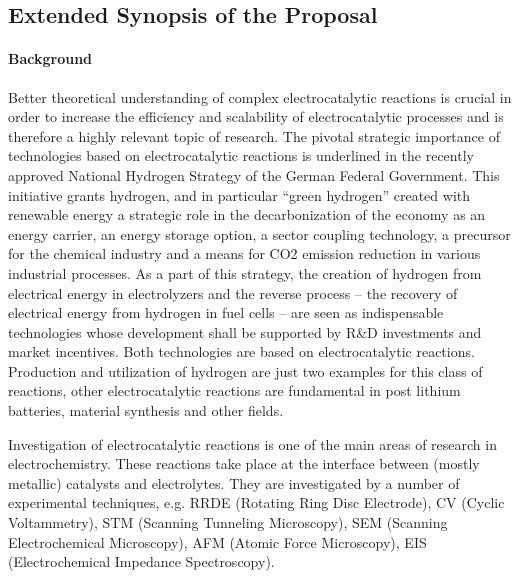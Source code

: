 \documentclass[a4paper,10pt]{article}
\begin{document}
\insertProjectHeader
{}


\subsection*{Extended Synopsis of the Proposal}

\paragraph{Background}

Better theoretical understanding of complex electrocatalytic reactions is
crucial in order to increase the efficiency  and scalability  of electrocatalytic processes
and is therefore a highly relevant topic of research.
The pivotal strategic importance of  technologies based on electrocatalytic reactions
is underlined in  the  recently  approved  National Hydrogen  Strategy of  the  German
Federal  Government. This initiative  grants  hydrogen,  and  in   particular  ``green
hydrogen''  created with  renewable  energy a  strategic  role in  the
decarbonization of the economy as an energy carrier, an energy storage
option, a  sector coupling  technology, a  precursor for  the chemical
industry  and a  means  for  CO2  emission reduction  in  various
industrial  processes. 
As  a part  of this  strategy, the  creation of
hydrogen  from  electrical energy  in  electrolyzers  and the  reverse
process --  the recovery  of electrical energy  from hydrogen  in fuel
cells -- are seen  as indispensable technologies whose development
shall be  supported by  R\&D investments  and market  incentives.
%
Both technologies are based  on electrocatalytic reactions. Production
and utilization  of hydrogen are just  two examples for this  class of
reactions, other  electrocatalytic reactions  are fundamental  in post
lithium  batteries,  material  synthesis  and  other  fields. 



Investigation of electrocatalytic  reactions is one of  the main areas
of research  in electrochemistry.  These  reactions take place  at the
interface between  (mostly metallic)  catalysts and  electrolytes.
They  are investigated  by a  number of  experimental techniques,  e.g.
RRDE    (Rotating   Ring    Disc   Electrode),   
CV  (Cyclic  Voltammetry),  
STM (Scanning Tunneling Microscopy), 
SEM (Scanning  Electrochemical Microscopy),
AFM (Atomic Force Microscopy), 
EIS (Electrochemical Impedance Spectroscopy).
\end{document}
